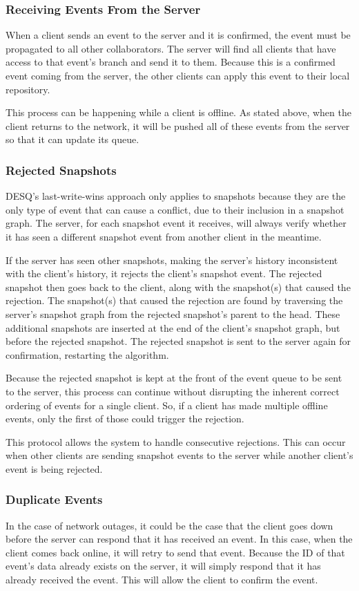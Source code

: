 \subsubsection{Receiving Events From the Server}

When a client sends an event to the server and it is confirmed, the event must be propagated to all other collaborators. The server will find all clients that have access to that event's branch and send it to them. Because this is a confirmed event coming from the server, the other clients can apply this event to their local repository.

This process can be happening while a client is offline. As stated above, when the client returns to the network, it will be pushed all of these events from the server so that it can update its queue. 

\subsubsection{Rejected Snapshots}

DESQ's last-write-wins approach only applies to snapshots because they are the only type of event that can cause a conflict, due to their inclusion in a snapshot graph. The server, for each snapshot event it receives, will always verify whether it has seen a different snapshot event from another client in the meantime.

If the server has seen other snapshots, making the server's history inconsistent with the client's history, it rejects the client's snapshot event. The rejected snapshot then goes back to the client, along with the snapshot(s) that caused the rejection. The snapshot(s) that caused the rejection are found by traversing the server's snapshot graph from the rejected snapshot's parent to the head. These additional snapshots are inserted at the end of the client's snapshot graph, but before the rejected snapshot. The rejected snapshot is sent to the server again for confirmation, restarting the algorithm. 

Because the rejected snapshot is kept at the front of the event queue to be sent to the server, this process can continue without disrupting the inherent correct ordering of events for a single client. So, if a client has made multiple offline events, only the first of those could trigger the rejection.

This protocol allows the system to handle consecutive rejections. This can occur when other clients are sending snapshot events to the server while another client's event is being rejected.

\subsubsection{Duplicate Events}

In the case of network outages, it could be the case that the client goes down before the server can respond that it has received an event. In this case, when the client comes back online, it will retry to send that event. Because the ID of that event's data already exists on the server, it will simply respond that it has already received the event. This will allow the client to confirm the event.